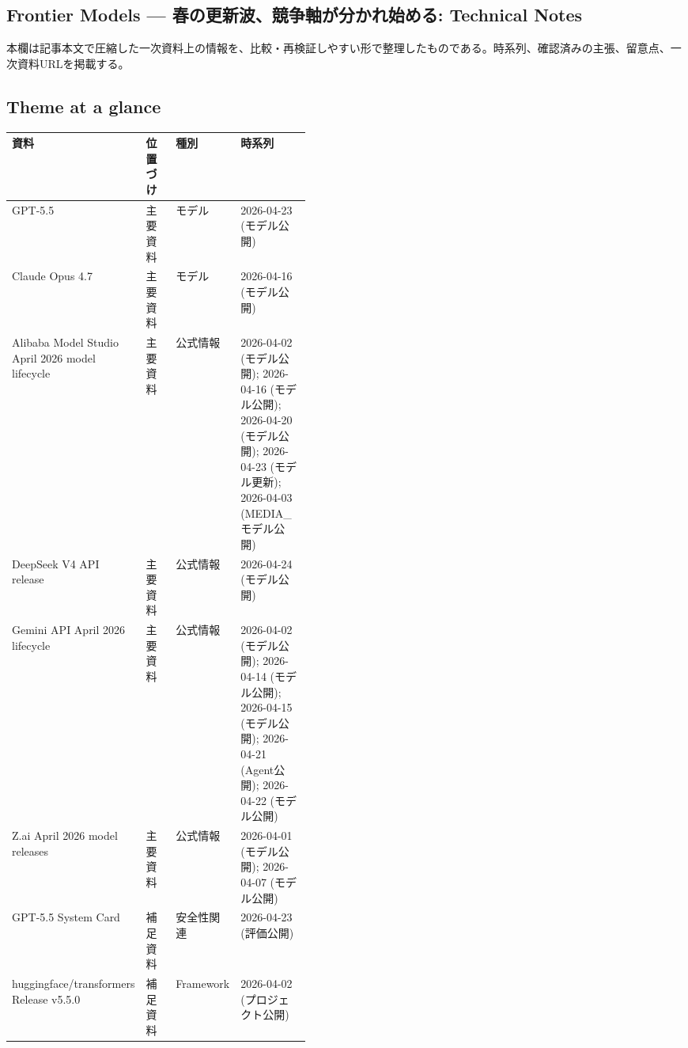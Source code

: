 \subsection*{Frontier Models — 春の更新波、競争軸が分かれ始める: Technical Notes}
本欄は記事本文で圧縮した一次資料上の情報を、比較・再検証しやすい形で整理したものである。時系列、確認済みの主張、留意点、一次資料URLを掲載する。
\medskip
\subsection*{Theme at a glance}
\begin{center}
\footnotesize
\begin{tabularx}{\linewidth}{@{}p{0.20\linewidth}p{0.10\linewidth}p{0.14\linewidth}X@{}}
\toprule
資料 & 位置づけ & 種別 & 時系列 \\
\midrule
GPT-5.5 & 主要資料 & モデル & 2026-04-23 (モデル公開) \\
Claude Opus 4.7 & 主要資料 & モデル & 2026-04-16 (モデル公開) \\
Alibaba Model Studio April 2026 model lifecycle & 主要資料 & 公式情報 & 2026-04-02 (モデル公開); 2026-04-16 (モデル公開); 2026-04-20 (モデル公開); 2026-04-23 (モデル更新); 2026-04-03 (MEDIA\_モデル公開) \\
DeepSeek V4 API release & 主要資料 & 公式情報 & 2026-04-24 (モデル公開) \\
Gemini API April 2026 lifecycle & 主要資料 & 公式情報 & 2026-04-02 (モデル公開); 2026-04-14 (モデル公開); 2026-04-15 (モデル公開); 2026-04-21 (Agent公開); 2026-04-22 (モデル公開) \\
Z.ai April 2026 model releases & 主要資料 & 公式情報 & 2026-04-01 (モデル公開); 2026-04-07 (モデル公開) \\
GPT-5.5 System Card & 補足資料 & 安全性関連 & 2026-04-23 (評価公開) \\
huggingface/transformers Release v5.5.0 & 補足資料 & Framework & 2026-04-02 (プロジェクト公開) \\
\bottomrule
\end{tabularx}
\end{center}
\normalsize

